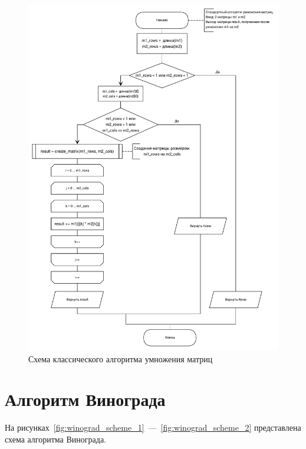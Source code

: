 \begin{figure}[H]
\centering
\includegraphics[width=\textwidth]{inc/img/standard_mult.pdf}
\caption{Схема классического алгоритма умножения матриц}
\label{fig:classic_mult_scheme}
\end{figure}

\section{Алгоритм Винограда}

На рисунках~\ref{fig:winograd_scheme_1}~---~\ref{fig:winograd_scheme_2} представлена схема алгоритма Винограда.

